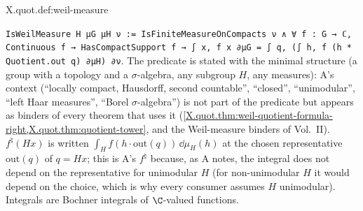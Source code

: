 \begin{definition}
\end{definition}
\begin{tfformal}{X.quot.def:weil-measure}
\begin{tffidelity}
\texttt{IsWeilMeasure H μG μH ν := IsFiniteMeasureOnCompacts ν ∧ ∀ f : G → ℂ, Continuous f → HasCompactSupport f → ∫ x, f x ∂μG = ∫ q, (∫ h, f (h * Quotient.out q) ∂μH) ∂ν}. The predicate is stated with the minimal structure (a group with a topology and a $\sigma$-algebra, any subgroup $H$, any measures): A's context (``locally compact, Hausdorff, second countable'', ``closed'', ``unimodular'', ``left Haar measures'', ``Borel $\sigma$-algebra'') is not part of the predicate but appears as binders of every theorem that uses it (\cref{X.quot.thm:weil-quotient-formula-right,X.quot.thm:quotient-tower}, and the Weil-measure binders of Vol.~II). $f^\natural(Hx)$ is written $\int_Hf(h\cdot\mathrm{out}(q))\,\dd\mu_H(h)$ at the chosen representative $\mathrm{out}(q)$ of $q=Hx$; this is A's $f^\natural$ because, as A notes, the integral does not depend on the representative for unimodular $H$ (for non-unimodular $H$ it would depend on the choice, which is why every consumer assumes $H$ unimodular). Integrals are Bochner integrals of $\C$-valued functions.
\end{tffidelity}
\end{tfformal}

